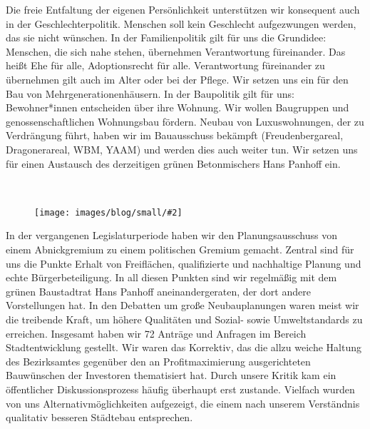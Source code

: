 \documentclass[a4paper,10pt]{article}
\newcommand{\mysection}[1]{{\vspace{1cm}\noindent\color{gray}{\ttfamily\LARGE\raggedright #1}\\\medskip}}
\newcommand{\abschnitt}[2]{%
\mysection{\raggedright #1}%
\begin{figure}[t]%
\vspace*{-2.7cm}%
\hspace*{-2.1cm}%
\texttt{[image: images/blog/small/\#2]} %
\end{figure}%
}
\newcommand{\bottomfigure}[1]{
\parbox{5cm}{
\vspace*{1cm}%
\texttt{[image: ./images/blog/small/\#1]}
}
}
\begin{document}
Die freie Entfaltung der eigenen Persönlichkeit unterstützen wir
konsequent auch in der Geschlechterpolitik. Menschen soll kein
Geschlecht aufgezwungen werden, das sie nicht wünschen. In der
Familienpolitik gilt für uns die Grundidee: Menschen, die sich nahe
stehen, übernehmen Verantwortung füreinander. Das heißt Ehe für alle,
Adoptionsrecht für alle. Verantwortung füreinander zu übernehmen gilt
auch im Alter oder bei der Pflege. Wir setzen uns ein für den Bau von
Mehrgenerationenhäusern. In der Baupolitik gilt für uns: Bewohner*innen
entscheiden über ihre Wohnung. Wir wollen Baugruppen und
genossenschaftlichen Wohnungsbau fördern. Neubau von Luxuswohnungen, der
zu Verdrängung führt, haben wir im Bauausschuss bekämpft
(Freudenbergareal, Dragonerareal, WBM, YAAM) und werden dies auch weiter
tun. Wir setzen uns für einen Austausch des derzeitigen grünen
Betonmischers Hans Panhoff ein.



\clearpage
\abschnitt{Stadtentwicklung}{Betonmischer.png}

In der vergangenen Legislaturperiode haben wir den Planungsausschuss von
einem Abnickgremium zu einem politischen Gremium gemacht. Zentral sind
für uns die Punkte Erhalt von Freiflächen, qualifizierte und nachhaltige
Planung und echte Bürgerbeteiligung. In all diesen Punkten sind wir
regelmäßig mit dem grünen Baustadtrat Hans Panhoff aneinandergeraten,
der dort andere Vorstellungen hat. In den Debatten um große
Neubauplanungen waren meist wir die treibende Kraft, um höhere
Qualitäten und Sozial- sowie Umweltstandards zu erreichen. Insgesamt
haben wir 72 Anträge und Anfragen im Bereich Stadtentwicklung gestellt.
Wir waren das Korrektiv, das die allzu weiche Haltung des Bezirksamtes
gegenüber den an Profitmaximierung ausgerichteten Bauwünschen der
Investoren thematisiert hat. Durch unsere Kritik kam ein öffentlicher
Diskussionsprozess häufig überhaupt erst zustande. Vielfach wurden von
uns Alternativmöglichkeiten aufgezeigt, die einem nach unserem
Verständnis qualitativ besseren Städtebau entsprechen.
\end{document}
